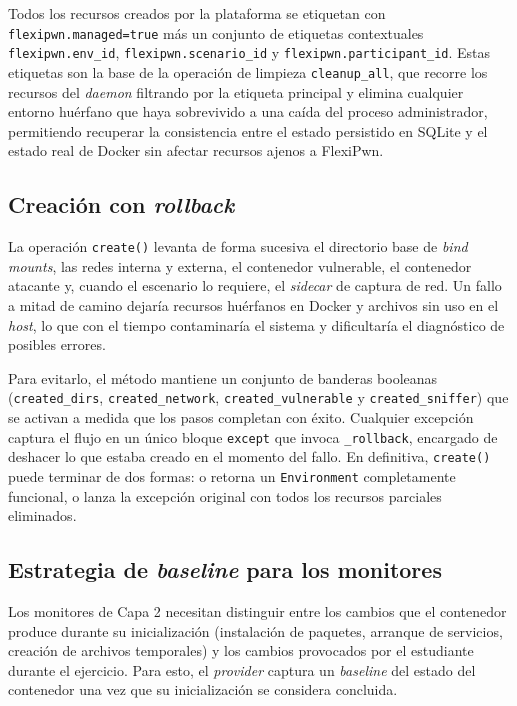 Todos los recursos creados por la plataforma se etiquetan con
\texttt{flexipwn.managed=true} más un conjunto de etiquetas contextuales
\texttt{flexipwn.env\_id}, \texttt{flexipwn.scenario\_id} y
\texttt{flexipwn.participant\_id}. Estas etiquetas son la base de la operación
de limpieza \texttt{cleanup\_all}, que recorre los recursos del \textit{daemon}
filtrando por la etiqueta principal y elimina cualquier entorno huérfano que
haya sobrevivido a una caída del proceso administrador, permitiendo recuperar la
consistencia entre el estado persistido en SQLite y el estado real de Docker sin
afectar recursos ajenos a FlexiPwn.

\subsection{Creación con \textit{rollback}}

La operación \texttt{create()} levanta de forma sucesiva el directorio base de
\textit{bind mounts}, las redes interna y externa, el contenedor vulnerable, el
contenedor atacante y, cuando el escenario lo requiere, el \textit{sidecar} de
captura de red. Un fallo a mitad de camino dejaría recursos huérfanos en Docker
y archivos sin uso en el \textit{host}, lo que con el tiempo contaminaría el
sistema y dificultaría el diagnóstico de posibles errores.

Para evitarlo, el método mantiene un conjunto de banderas booleanas
(\texttt{created\_dirs}, \texttt{created\_network}, \texttt{created\_vulnerable}
y \texttt{created\_sniffer}) que se activan a medida que los pasos completan con
éxito. Cualquier excepción captura el flujo en un único
bloque \texttt{except} que invoca \texttt{\_rollback}, encargado de deshacer
lo que estaba creado en el momento del fallo. En definitiva,
\texttt{create()} puede terminar de dos formas: o retorna un
\texttt{Environment} completamente funcional, o lanza la excepción original con
todos los recursos parciales eliminados.

\subsection{Estrategia de \textit{baseline} para los monitores}
\label{sec:capa1-baseline}

Los monitores de Capa 2 necesitan distinguir entre los cambios que el contenedor
produce durante su inicialización (instalación de paquetes, arranque de
servicios, creación de archivos temporales) y los cambios provocados por el
estudiante durante el ejercicio. Para esto, el \textit{provider} captura un
\textit{baseline} del estado del contenedor una vez que su inicialización se
considera concluida.


